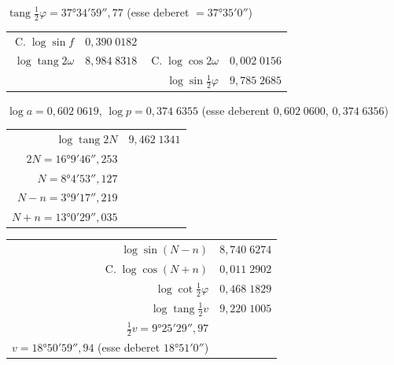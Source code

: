 \documentclass[12pt,a4paper]{article}
\newcommand{\tang}{\mathop{\mathrm{tang}}\nolimits}
\newcommand{\C}{\mathop{\mathrm{C.}}\nolimits}
\begin{document}
\begin{center}
$\tang\tfrac{1}{2}\varphi = 37°34'59'',77$ (esse deberet $= 37°35'0''$)
\end{center}

\begin{center}
\begin{tabular}{@{}r@{\quad}l@{\qquad}r@{\quad}l@{}}
$\C\log\sin f$ & $0{,}390\;0182$ & & \\
$\log\tang 2\omega$ & $8{,}984\;8318$ & $\C\log\cos 2\omega$ & $0{,}002\;0156$ \\
& & $\log\sin\tfrac{1}{2}\varphi$ & $9{,}785\;2685$
\end{tabular}
\end{center}

\begin{center}
$\log a = 0{,}602\;0619$, $\log p = 0{,}374\;6355$ (esse deberent $0{,}602\;0600$, $0{,}374\;6356$)
\end{center}

\begin{center}
\begin{tabular}{@{}r@{\quad}l@{}}
$\log\tang 2N$ & $9{,}462\;1341$ \\
$2N = 16°9'46'',253$ & \\
$N = 8°4'53'',127$ & \\
$N - n = 3°9'17'',219$ & \\
$N + n = 13°0'29'',035$ &
\end{tabular}
\end{center}

\begin{center}
\begin{tabular}{@{}r@{\quad}l@{}}
$\log\sin(N - n)$ & $8{,}740\;6274$ \\
$\C\log\cos(N + n)$ & $0{,}011\;2902$ \\
$\log\cot\tfrac{1}{2}\varphi$ & $0{,}468\;1829$ \\ \hline
$\log\tang\tfrac{1}{2}v$ & $9{,}220\;1005$ \\
$\tfrac{1}{2}v = 9°25'29'',97$ & \\
$v = 18°50'59'',94$ (esse deberet $18°51'0''$) &
\end{tabular}
\end{center}
\end{document}
